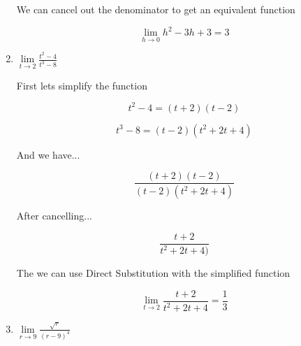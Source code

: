 \documentclass{article}
\begin{document}
\begin{enumerate}
			We can cancel out the denominator to get an equivalent function

			$$\lim \limits _{h \to 0} h^2 - 3h + 3 = 3$$

		\item $\lim \limits _{t \to 2} \frac{t^2 - 4}{t^3 - 8}$

			First lets simplify the function

			$$t^2 - 4 = (t + 2)(t-2)$$

			$$t^3 - 8 = (t-2)(t^2 + 2t + 4)$$

			And we have...

			$$\frac{(t+2)(t-2)}{(t-2)(t^2 + 2t + 4)}$$

			After cancelling...

			$$\frac{t+2}{t^2+2t+4)}$$

			The we can use Direct Substitution with the simplified function

			$$\lim \limits _{t \to 2} \frac{t+2}{t^2+2t+4} = \frac{1}{3}$$	

		\item $\lim \limits _{r \to 9} \frac{\sqrt{r}}{(r-9)^4}$

			
\end{enumerate}
\end{document}

